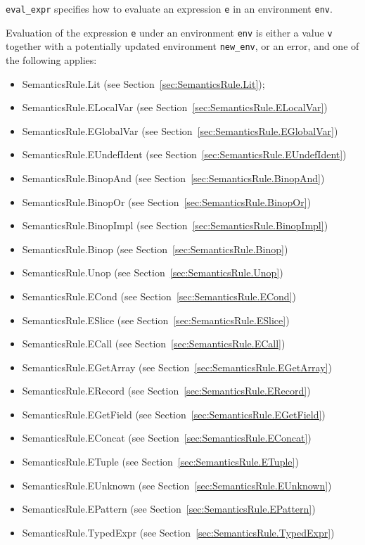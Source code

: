 \documentclass{book}
\begin{document}
\texttt{eval\_expr} specifies how to evaluate an expression \texttt{e} in an
environment \texttt{env}. 

Evaluation of the expression \texttt{e} under an environment \texttt{env} is
either a value \texttt{v} together with a potentially updated
environment \texttt{new\_env}, or an error, and one of the following applies:
\begin{itemize}
\item SemanticsRule.Lit (see Section~\ref{sec:SemanticsRule.Lit});
\item SemanticsRule.ELocalVar (see Section~\ref{sec:SemanticsRule.ELocalVar})
\item SemanticsRule.EGlobalVar (see Section~\ref{sec:SemanticsRule.EGlobalVar})
\item SemanticsRule.EUndefIdent (see Section~\ref{sec:SemanticsRule.EUndefIdent})
\item SemanticsRule.BinopAnd (see Section~\ref{sec:SemanticsRule.BinopAnd})
\item SemanticsRule.BinopOr (see Section~\ref{sec:SemanticsRule.BinopOr})
\item SemanticsRule.BinopImpl (see Section~\ref{sec:SemanticsRule.BinopImpl})
\item SemanticsRule.Binop (see Section~\ref{sec:SemanticsRule.Binop})
\item SemanticsRule.Unop (see Section~\ref{sec:SemanticsRule.Unop})
\item SemanticsRule.ECond (see Section~\ref{sec:SemanticsRule.ECond})
\item SemanticsRule.ESlice (see Section~\ref{sec:SemanticsRule.ESlice})
\item SemanticsRule.ECall (see Section~\ref{sec:SemanticsRule.ECall})
\item SemanticsRule.EGetArray (see Section~\ref{sec:SemanticsRule.EGetArray})
\item SemanticsRule.ERecord (see Section~\ref{sec:SemanticsRule.ERecord})
\item SemanticsRule.EGetField (see Section~\ref{sec:SemanticsRule.EGetField})
\item SemanticsRule.EConcat (see Section~\ref{sec:SemanticsRule.EConcat})
\item SemanticsRule.ETuple (see Section~\ref{sec:SemanticsRule.ETuple})
\item SemanticsRule.EUnknown (see Section~\ref{sec:SemanticsRule.EUnknown})
\item SemanticsRule.EPattern (see Section~\ref{sec:SemanticsRule.EPattern})
\item SemanticsRule.TypedExpr (see Section~\ref{sec:SemanticsRule.TypedExpr})
\end{itemize}
\end{document}
